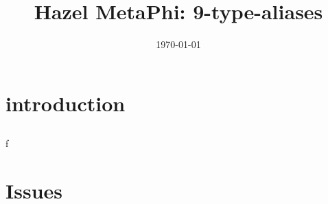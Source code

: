 \documentclass[12pt,fleqn]{article}
\begin{document}
\title{Hazel MetaPhi: 9-type-aliases}
\author{}
\date{\today}
\maketitle
\section{introduction}
    \subsection*{}
    f
\section{Issues}
    \subsection*{}
\end{document}
